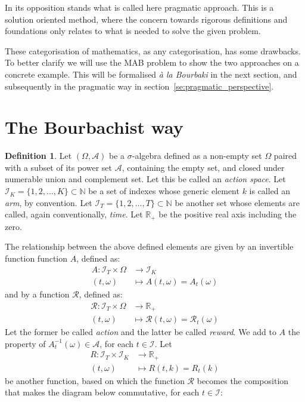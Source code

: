 \documentclass[]{scrartcl}
\theoremstyle{definition}
\newtheorem{definition}{Definition}[section]
\begin{document}
In its opposition stands what is called here pragmatic approach. This is a solution oriented method, where the concern towards rigorous definitions and foundations only relates to what is needed to solve the given problem. 

These categorisation of mathematics, as any categorisation, has some drawbacks. To better clarify we will use the MAB problem to show the two approaches on a concrete example. This will be formalised \emph{à la Bourbaki} in the next section, and subsequently in the pragmatic way in section~\ref{se:pragmatic_perspective}.


\section{The Bourbachist way}
\label{se:bourbaki_perspective}

\begin{definition}
    Let $(\Omega, \mathcal{A})$ be a $\sigma$-algebra defined as a non-empty set $\Omega$ paired with a subset of its power set $\mathcal{A}$, containing the empty set, and closed under numerable union and complement set. Let this be called an \emph{action space}. Let $\mathcal{I}_{K} = \{1,2, \dots , K\} \subset \mathbb{N}$ be a set of indexes whose generic element $k$ is called an \emph{arm}, by convention. Let $\mathcal{I}_{T} = \{1,2, \dots , T\} \subset \mathbb{N}$ be another set whose elements are called, again conventionally, \emph{time}. Let $\mathbb{R}_{+}$ be the positive real axis including the zero.
\end{definition}

The relationship between the above defined elements are given by an invertible function function $A$, defined as:
\begin{align*}
    A : \mathcal{I}_T \times \Omega &\longrightarrow \mathcal{I}_K \\
        (t, \omega) &\longmapsto A(t, \omega) = A_t(\omega)
\end{align*}
and by a function $\mathcal{R}$, defined as:
\begin{align*}
\mathcal{R} : \mathcal{I}_T \times \Omega &\longrightarrow \mathbb{R}_{+} \\
(t, \omega) &\longmapsto \mathcal{R}(t, \omega) = \mathcal{R}_t(\omega)
\end{align*}
Let the former be called \emph{action} and the latter be called \emph{reward}. 
We add to $A$ the property of $A_t^{-1}(\omega) \in \mathcal{A}$, for each $t \in \mathcal{I}$.
Let
\begin{align*}
R : \mathcal{I}_T \times \mathcal{I}_K &\longrightarrow \mathbb{R}_{+} \\
(t, \omega) &\longmapsto R(t, k) = R_t(k)
\end{align*}
be another function, based on which the function $\mathcal{R}$ becomes the composition  that makes the diagram below commutative, for each $t \in \mathcal{I}$:
\end{document}

